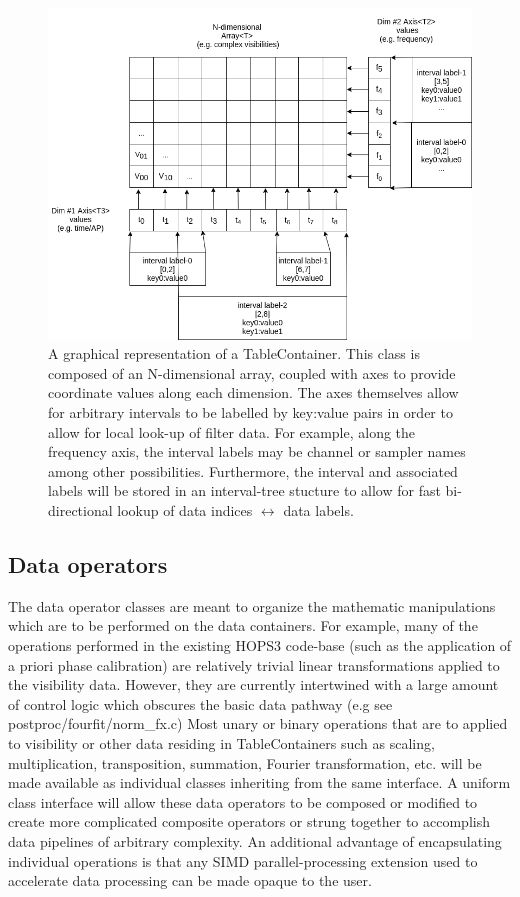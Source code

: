 \documentclass[hidelinks]{article}
\let\Oldsubsection\subsection
\renewcommand{\subsection}{\FloatBarrier\Oldsubsection}
\begin{document}
\begin{figure}[h!]
\begin{center}
  \includegraphics[width=\textwidth]{./data-container-baseline.png}
    \caption{A graphical representation of a TableContainer. This class is composed of an N-dimensional array, coupled with axes to provide coordinate values
    along each dimension. The axes themselves allow for arbitrary intervals to be labelled by key:value pairs in order to allow for local look-up of filter data.
    For example, along the frequency axis, the interval labels may be channel or sampler names among other possibilities. Furthermore, the interval and associated
    labels will be stored in an interval-tree stucture to allow for fast bi-directional lookup of data indices $\leftrightarrow$ data labels.}
    \label{fig:table-container}
\end{center}
\end{figure}

\subsection{Data operators}

The data operator classes are meant to organize the mathematic manipulations which are to be performed on the data containers. For example, many of the operations performed in the existing HOPS3 code-base (such as the application of a priori phase calibration) are relatively trivial linear transformations applied to the visibility data. However, they are currently intertwined with a large amount of control logic which obscures the basic data pathway (e.g see postproc/fourfit/norm\_fx.c)
Most unary or binary operations that are to applied to visibility or other data residing in TableContainers such as scaling, multiplication, transposition, summation, Fourier transformation, etc. will be made available as individual classes inheriting from the same interface. A uniform class interface will allow these data operators to be composed or modified to create more complicated composite operators or strung together to accomplish data pipelines of arbitrary complexity. An additional advantage of encapsulating individual operations is that any SIMD parallel-processing extension used to accelerate data processing can be made opaque to the user.
\end{document}
